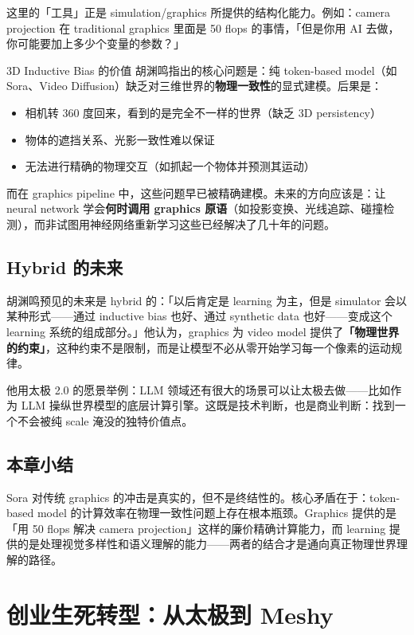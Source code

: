 \documentclass[a4paper]{article}
\begin{document}
这里的「工具」正是 simulation/graphics 所提供的结构化能力。例如：camera projection 在 traditional graphics 里面是 50 flops 的事情，「但是你用 AI 去做，你可能要加上多少个变量的参数？」

\begin{importantbox}{3D Inductive Bias 的价值}
胡渊鸣指出的核心问题是：纯 token-based model（如 Sora、Video Diffusion）缺乏对三维世界的\textbf{物理一致性}的显式建模。后果是：
\begin{itemize}
    \item 相机转 360 度回来，看到的是完全不一样的世界（缺乏 3D persistency）
    \item 物体的遮挡关系、光影一致性难以保证
    \item 无法进行精确的物理交互（如抓起一个物体并预测其运动）
\end{itemize}
而在 graphics pipeline 中，这些问题早已被精确建模。未来的方向应该是：让 neural network 学会\textbf{何时调用 graphics 原语}（如投影变换、光线追踪、碰撞检测），而非试图用神经网络重新学习这些已经解决了几十年的问题。
\end{importantbox}

\subsection{Hybrid 的未来}

胡渊鸣预见的未来是 hybrid 的：「以后肯定是 learning 为主，但是 simulator 会以某种形式——通过 inductive bias 也好、通过 synthetic data 也好——变成这个 learning 系统的组成部分。」他认为，graphics 为 video model 提供了\textbf{「物理世界的约束」}，这种约束不是限制，而是让模型不必从零开始学习每一个像素的运动规律。

他用太极 2.0 的愿景举例：LLM 领域还有很大的场景可以让太极去做——比如作为 LLM 操纵世界模型的底层计算引擎。这既是技术判断，也是商业判断：找到一个不会被纯 scale 淹没的独特价值点。

\subsection{本章小结}
Sora 对传统 graphics 的冲击是真实的，但不是终结性的。核心矛盾在于：token-based model 的计算效率在物理一致性问题上存在根本瓶颈。Graphics 提供的是「用 50 flops 解决 camera projection」这样的廉价精确计算能力，而 learning 提供的是处理视觉多样性和语义理解的能力——两者的结合才是通向真正物理世界理解的路径。

\section{创业生死转型：从太极到 Meshy}
\end{document}
